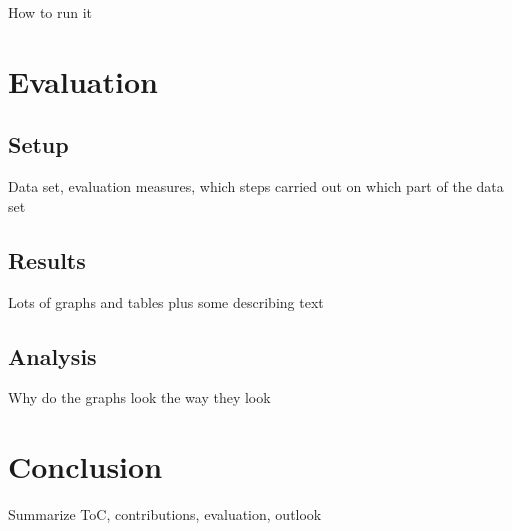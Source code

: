 \documentclass[11pt, a4paper, abstraction]{scrartcl}
\begin{document}
How to run it

\section{Evaluation}

\subsection{Setup}

Data set, evaluation measures, which steps carried out on which part of the data set

\subsection{Results}

Lots of graphs and tables plus some describing text

\subsection{Analysis}

Why do the graphs look the way they look

\section{Conclusion}

Summarize ToC, contributions, evaluation, outlook
\end{document}
